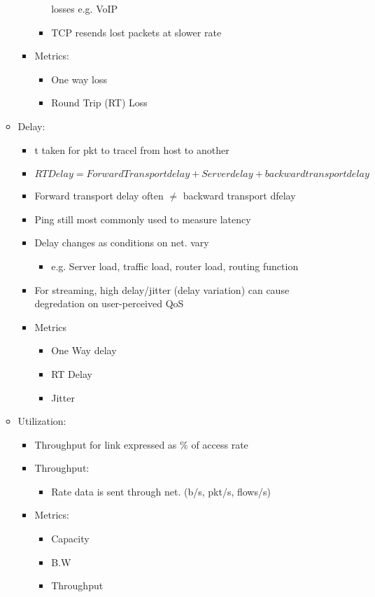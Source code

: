 \begin{itemize}
\begin{itemize}
\begin{itemize}
\begin{itemize}
					losses e.g. VoIP
				\item TCP resends lost packets at slower rate
			\end{itemize}
			\item Metrics:
			\begin{itemize}
				\item One way loss
				\item Round Trip (RT) Loss
			\end{itemize}
		\end{itemize}
		\item Delay:
		\begin{itemize}
			\item t taken for pkt to tracel from host to another
			\item $RT Delay = Forward Transport delay + Server delay +
				backward transport delay$
			\item Forward transport delay often $\neq$ backward
				transport dfelay
			\item Ping still most commonly used to measure latency
			\item Delay changes as conditions on net. vary
			\begin{itemize}
				\item e.g. Server load, traffic load, router
					load, routing function
			\end{itemize}
			\item For streaming, high delay/jitter (delay variation)
				can cause degredation on user-perceived QoS
			\item Metrics
			\begin{itemize}
				\item One Way delay
				\item RT Delay
				\item Jitter
			\end{itemize}
		\end{itemize}
		\item Utilization:
		\begin{itemize}
			\item Throughput for link expressed as $\%$ of access
				rate
			\item Throughput:
			\begin{itemize}
				\item Rate data is sent through net. (b/s,
					pkt/s, flows/s)
			\end{itemize}
			\item Metrics:
			\begin{itemize}
				\item Capacity
				\item B.W
				\item Throughput
			\end{itemize}
		\end{itemize}
	\end{itemize}
\end{itemize}
